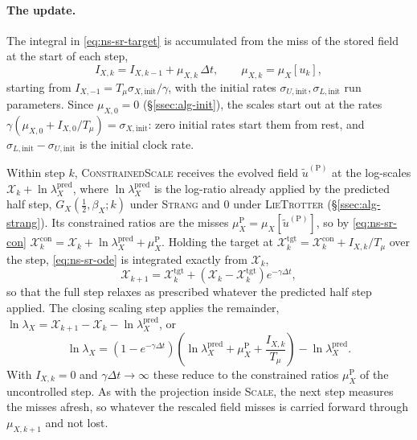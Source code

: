 \documentclass{article}
\begin{document}
\paragraph{The update.}
The integral in \eqref{eq:ns-sr-target} is accumulated from the miss of the
stored field at the start of each step,
\begin{equation}\label{eq:ns-sr-integral}
  I_{X,k} = I_{X,k-1} + \mu_{X,k}\, \Delta t,
  \qquad
  \mu_{X,k} = \mu_X[u_k],
\end{equation}
starting from $I_{X,-1} = T_\mu \sigma_{X,\mathrm{init}} / \gamma$, with the
initial rates $\sigma_{U,\mathrm{init}}, \sigma_{L,\mathrm{init}}$ run
parameters. Since $\mu_{X,0} = 0$ (\S\ref{ssec:alg-init}), the scales start
out at the rates $\gamma (\mu_{X,0} + I_{X,0}/T_\mu) = \sigma_{X,\mathrm{init}}$:
zero initial rates start them from rest, and
$\sigma_{L,\mathrm{init}} - \sigma_{U,\mathrm{init}}$ is the initial clock
rate. \par
Within step $k$, \textsc{ConstrainedScale} receives the evolved field
$\tilde u^{(\mathrm{P})}$ at the log-scales
$\mathcal{X}_k + \ln \lambda_X^{\mathrm{pred}}$, where
$\ln \lambda_X^{\mathrm{pred}}$ is the log-ratio already applied by the
predicted half step, $G_X(\tfrac12, \beta_X; k)$ under \textsc{Strang} and
$0$ under \textsc{LieTrotter} (\S\ref{ssec:alg-strang}). Its constrained
ratios are the misses $\mu_X^{\mathrm{P}} = \mu_X[\tilde u^{(\mathrm{P})}]$,
so by \eqref{eq:ns-sr-con}
$\mathcal{X}^{\mathrm{con}}_k = \mathcal{X}_k + \ln \lambda_X^{\mathrm{pred}} + \mu_X^{\mathrm{P}}$.
Holding the target at
$\mathcal{X}^{\mathrm{tgt}}_k = \mathcal{X}^{\mathrm{con}}_k + I_{X,k}/T_\mu$
over the step, \eqref{eq:ns-sr-ode} is integrated exactly from
$\mathcal{X}_k$,
\begin{equation}\label{eq:ns-sr-update}
  \mathcal{X}_{k+1} = \mathcal{X}^{\mathrm{tgt}}_k
  + \left( \mathcal{X}_k - \mathcal{X}^{\mathrm{tgt}}_k \right) e^{-\gamma \Delta t},
\end{equation}
so that the full step relaxes as prescribed whatever the predicted half step
applied. The closing scaling step applies the remainder,
$\ln \lambda_X = \mathcal{X}_{k+1} - \mathcal{X}_k - \ln \lambda_X^{\mathrm{pred}}$, or
\begin{equation}\label{eq:ns-sr-ratios}
  \ln \lambda_X = \left( 1 - e^{-\gamma \Delta t} \right)
  \left( \ln \lambda_X^{\mathrm{pred}} + \mu_X^{\mathrm{P}} + \frac{I_{X,k}}{T_\mu} \right)
  - \ln \lambda_X^{\mathrm{pred}} .
\end{equation}
With $I_{X,k} = 0$ and $\gamma \Delta t \to \infty$ these reduce to the
constrained ratios $\mu_X^{\mathrm{P}}$ of the uncontrolled step. As with the
projection inside \textsc{Scale}, the next step measures the misses afresh,
so whatever the rescaled field misses is carried forward through
$\mu_{X,k+1}$ and not lost.
\end{document}
